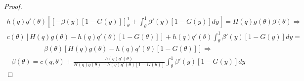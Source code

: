 \begin{proof}
\begin{align*}
	\end{align*}
	\begin{align*} h(q)q'(\theta) \left[ [-\beta(y)[1-G(y)]]_{\theta}^1 + \int_{\theta}^1 \beta'(y)[1-G(y)]dy \right] = H(q)g(\theta)\beta(\theta) \Rightarrow
	\end{align*}
	\begin{align*}
		c(\theta)[H(q)g(\theta)-h(q)q'(\theta)[1-G(\theta)]] + h(q)q'(\theta) \int_{\theta}^1 \beta'(y)[1-G(y)]dy =
	\end{align*}
 	\begin{align*}
		\beta(\theta)[H(q)g(\theta) - h(q)q'(\theta)[1-G(\theta)]] \Rightarrow
	\end{align*}
	\begin{align*}
		\beta(\theta) = c(q,\theta) + \frac{h(q)q'(\theta)}{H(q)g(\theta) - h(q)q'(\theta)[1-G(\theta)]} \int_{\theta}^1 \beta'(y)[1-G(y)]dy
	\end{align*}
\end{proof}

